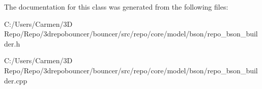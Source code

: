 The documentation for this class was generated from the following files\+:\begin{DoxyCompactItemize}
\item 
C\+:/\+Users/\+Carmen/3\+D Repo/\+Repo/3drepobouncer/bouncer/src/repo/core/model/bson/repo\+\_\+bson\+\_\+builder.\+h\item 
C\+:/\+Users/\+Carmen/3\+D Repo/\+Repo/3drepobouncer/bouncer/src/repo/core/model/bson/repo\+\_\+bson\+\_\+builder.\+cpp\end{DoxyCompactItemize}
